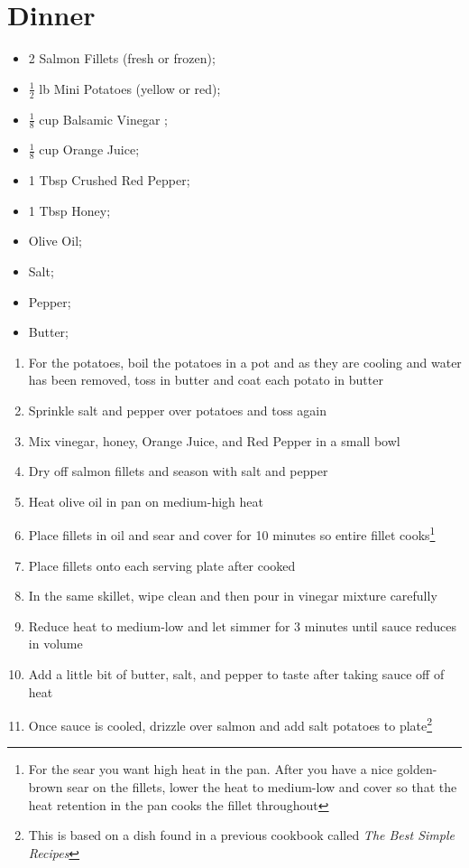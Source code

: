 \documentclass[oneside]{recipe}
\newcommand{\recipecolumn}[2]{
	\begin{multicols}{2}
	\raggedcolumns
	#1
	\columnbreak
	#2
	\end{multicols}
}
\begin{document}
\chapter{Dinner}

\recipecolumn{
	\begin{itemize}
	\item 2 Salmon Fillets (fresh or frozen);
	\item $\frac{1}{2}$ lb Mini Potatoes (yellow or red);
	\item $\frac{1}{8}$ cup Balsamic Vinegar ;
	\item $\frac{1}{8}$ cup Orange Juice;
	\item 1 Tbsp Crushed Red Pepper;
	\item 1 Tbsp Honey;
	\item Olive Oil;
  \item Salt;
	\item Pepper;
	\item Butter;
	\end{itemize}
}{
	\begin{enumerate}
		\item For the potatoes, boil the potatoes in a pot and as they are cooling and water has been removed, toss in butter and coat each potato in butter
		\item Sprinkle salt and pepper over potatoes and toss again
		\item Mix vinegar, honey, Orange Juice, and Red Pepper in a small bowl
		\item Dry off salmon fillets and season with salt and pepper
		\item Heat olive oil in pan on medium-high heat
		\item Place fillets in oil and sear and cover for 10 minutes so entire fillet cooks\footnote{For the sear you want high heat in the pan. After you have a nice golden-brown sear on the fillets, lower the heat to medium-low and cover so that the heat retention in the pan cooks the fillet throughout}
		\item Place fillets onto each serving plate after cooked
		\item In the same skillet, wipe clean and then pour in vinegar mixture carefully
		\item Reduce heat to medium-low and let simmer for 3 minutes until sauce reduces in volume
		\item Add a little bit of butter, salt, and pepper to taste after taking sauce off of heat
		\item Once sauce is cooled, drizzle over salmon and add salt potatoes to plate\footnote{This is based on a dish found in a previous cookbook called \textit{The Best Simple Recipes}}
	\end{enumerate}
}
\newpage
\end{document}
